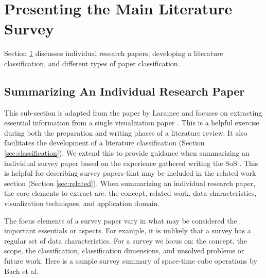 \section{Presenting the Main Literature Survey}\label{sec:presenting}
Section \ref{sec:presenting} discusses individual research papers, developing a literature classification, and different types of paper classification.
\subsection{Summarizing An Individual Research Paper} \label{sec:summary}
This sub-section is adapted from the paper by Laramee and focuses on extracting essential information from a single visualization paper \cite{laramee2011read}. This is a helpful exercise during both the preparation and writing phases of a literature review. It also facilitates the development of a literature classification (Section \ref{sec:classification}). We extend this to provide guidance when summarizing an individual survey paper based on the experience gathered writing the SoS \cite{mcnabb2017sos}. This is helpful for describing survey papers  that may be included in the related work section (Section \ref{sec:related}). When summarizing an individual research paper, the core elements to extract are: the concept, related work, data characteristics, visualization techniques, and application domain. 

The focus elements of a survey paper vary in what may be considered the important essentials or aspects. For example, it is unlikely that a survey has a regular set of data characteristics. For a survey we focus on: the concept, the scope, the classification, classification dimensions, and unsolved problems or future work. Here is a sample survey summary of space-time cube operations by Bach et al.\ \cite{bach2014review} 

